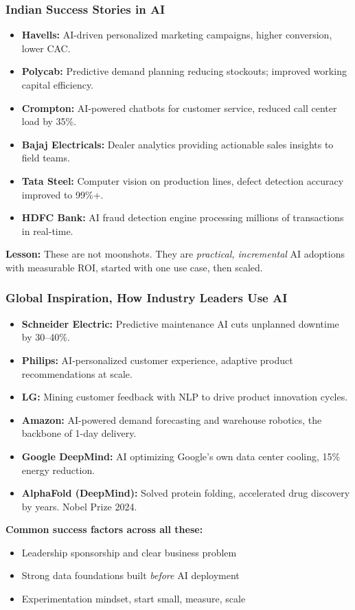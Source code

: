\begin{frame}[fragile]\frametitle{Indian Success Stories in AI}

\begin{itemize}
  \item \textbf{Havells:} AI-driven personalized marketing campaigns, higher conversion, lower CAC.
  \item \textbf{Polycab:} Predictive demand planning reducing stockouts; improved working capital efficiency.
  \item \textbf{Crompton:} AI-powered chatbots for customer service, reduced call center load by 35\%.
  \item \textbf{Bajaj Electricals:} Dealer analytics providing actionable sales insights to field teams.
  \item \textbf{Tata Steel:} Computer vision on production lines, defect detection accuracy improved to 99\%+.
  \item \textbf{HDFC Bank:} AI fraud detection engine processing millions of transactions in real-time.
\end{itemize}

\textbf{Lesson:} These are not moonshots. They are \textit{practical, incremental} AI adoptions with measurable ROI, started with one use case, then scaled.

\end{frame}

\begin{frame}[fragile]\frametitle{Global Inspiration, How Industry Leaders Use AI}

\begin{itemize}
  \item \textbf{Schneider Electric:} Predictive maintenance AI cuts unplanned downtime by 30--40\%.
  \item \textbf{Philips:} AI-personalized customer experience, adaptive product recommendations at scale.
  \item \textbf{LG:} Mining customer feedback with NLP to drive product innovation cycles.
  \item \textbf{Amazon:} AI-powered demand forecasting and warehouse robotics, the backbone of 1-day delivery.
  \item \textbf{Google DeepMind:} AI optimizing Google's own data center cooling, 15\% energy reduction.
  \item \textbf{AlphaFold (DeepMind):} Solved protein folding, accelerated drug discovery by years. Nobel Prize 2024.
\end{itemize}

\textbf{Common success factors across all these:}
\begin{itemize}
  \item Leadership sponsorship and clear business problem
  \item Strong data foundations built \textit{before} AI deployment
  \item Experimentation mindset, start small, measure, scale
\end{itemize}

\end{frame}

